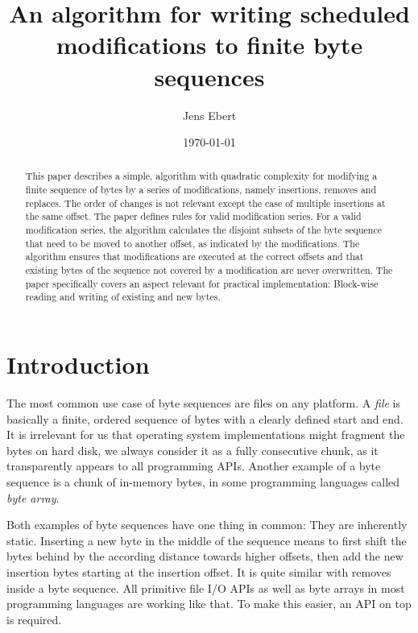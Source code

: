 \documentclass[english, 10pt, openright, twocolumn, landscape, twoside, notitlepage, a4paper, pdftex]		
{article}
\title{An algorithm for writing scheduled modifications to finite byte sequences}
\author{Jens Ebert}
\date{\today}
\begin{document}
\maketitle
\begin{abstract}
This paper describes a simple, algorithm with quadratic complexity for modifying a finite sequence of bytes by a series of modifications, namely insertions, removes and replaces. The order of changes is not relevant except the case of multiple insertions at the same offset. The paper defines rules for valid modification series. For a valid modification series, the algorithm calculates the disjoint subsets of the byte sequence that need to be moved to another offset, as indicated by the modifications. The algorithm ensures that modifications are executed at the correct offsets and that existing bytes of the sequence not covered by a modification are never overwritten. The paper specifically covers an aspect relevant for practical implementation: Block-wise reading and writing of existing and new bytes.
\end{abstract}


\section{Introduction}%
\label{sec:Introduction}%

The most common use case of byte sequences are files on any platform. A \emph{file} is basically a finite, ordered sequence of bytes with a clearly defined start and end. It is irrelevant for us that operating system implementations might fragment the bytes on hard disk, we always consider it as a fully consecutive chunk, as it transparently appears to all programming APIs. Another example of a byte sequence is a chunk of in-memory bytes, in some programming languages called \emph{byte array}.

Both examples of byte sequences have one thing in common: They are inherently static. Inserting a new byte in the middle of the sequence means to first shift the bytes behind by the according distance towards higher offsets, then add the new insertion bytes starting at the insertion offset. It is quite similar with removes inside a byte sequence. All primitive file I/O APIs as well as byte arrays in most programming languages are working like that. To make this easier, an API on top is required.
\end{document}

